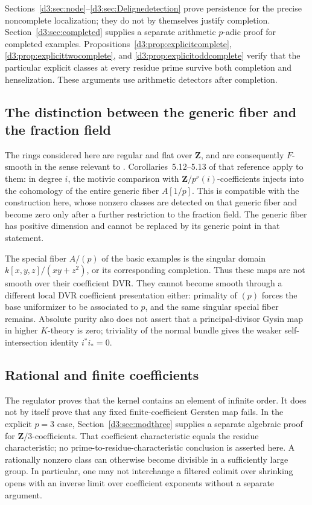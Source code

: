 \documentclass[11pt,a4paper]{amsart}
\numberwithin{equation}{section}
\theoremstyle{definition}
\theoremstyle{remark}
\newcommand{\Z}{\mathbf Z}
\begin{document}
Sections~\ref{d3:sec:node}--\ref{d3:sec:Delignedetection} prove persistence for the precise noncomplete localization; they do not by themselves justify completion. Section~\ref{d3:sec:completed} supplies a separate arithmetic $p$-adic proof for completed examples. Propositions~\ref{d3:prop:explicitcomplete}, \ref{d3:prop:explicittwocomplete}, and \ref{d3:prop:explicitoddcomplete} verify that the particular explicit classes at every residue prime survive both completion and henselization. These arguments use arithmetic detectors after completion.

\subsection{The distinction between the generic fiber and the fraction field}
The rings considered here are regular and flat over $\Z$, and are consequently $F$-smooth in the sense relevant to \cite{BouisMotivic}. Corollaries~5.12--5.13 of that reference apply to them: in degree $i$, the motivic comparison with $\Z/p^\nu(i)$-coefficients injects into the cohomology of the entire generic fiber $A[1/p]$. This is compatible with the construction here, whose nonzero classes are detected on that generic fiber and become zero only after a further restriction to the fraction field. The generic fiber has positive dimension and cannot be replaced by its generic point in that statement.

The special fiber $A/(p)$ of the basic examples is the singular domain $k[x,y,z]/(xy+z^2)$, or its corresponding completion. Thus these maps are not smooth over their coefficient DVR. They cannot become smooth through a different local DVR coefficient presentation either: primality of $(p)$ forces the base uniformizer to be associated to $p$, and the same singular special fiber remains. Absolute purity also does not assert that a principal-divisor Gysin map in higher $K$-theory is zero; triviality of the normal bundle gives the weaker self-intersection identity $i^*i_*=0$.

\subsection{Rational and finite coefficients}
The regulator proves that the kernel contains an element of infinite order. It does not by itself prove that any fixed finite-coefficient Gersten map fails. In the explicit $p=3$ case, Section~\ref{d3:sec:modthree} supplies a separate algebraic proof for $\Z/3$-coefficients. That coefficient characteristic equals the residue characteristic; no prime-to-residue-characteristic conclusion is asserted here. A rationally nonzero class can otherwise become divisible in a sufficiently large group. In particular, one may not interchange a filtered colimit over shrinking opens with an inverse limit over coefficient exponents without a separate argument.
\end{document}
